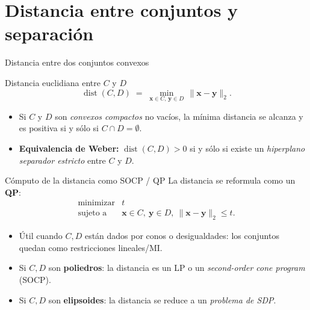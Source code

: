 \documentclass[10pt,aspectratio=169]{beamer}
\newcommand{\x}{\mathbf{x}}
\newcommand{\y}{\mathbf{y}}
\newcommand{\0}{\mathbf{0}}
\newcommand{\1}{\mathbf{1}}
\begin{document}
\section{Distancia entre conjuntos y separación}
\begin{frame}{Distancia entre dos conjuntos convexos}
  \begin{block}{Distancia euclidiana entre $C$ y $D$}
    \begin{equation*}
      \operatorname{dist}(C,D) \;=\; \min_{\x\in C,\,\y\in D}\, \|\x - \y\|_2.
    \end{equation*}
  \end{block}
  \begin{itemize}
    \item Si $C$ y $D$ son \emph{convexos compactos} no vacíos, la
          mínima distancia se alcanza y es positiva si y sólo si
          $C\cap D=\emptyset$.
    \item \textbf{Equivalencia de Weber:} $\operatorname{dist}(C,D)>0$
          si y sólo si existe un \emph{hiperplano separador estricto}
          entre $C$ y $D$.
  \end{itemize}
\end{frame}

\begin{frame}{Cómputo de la distancia como SOCP / QP}
  La distancia se reformula como un \textbf{QP}:
  \[
    \begin{array}{ll}
      \text{minimizar} & t \\
      \text{sujeto a}  & \x\in C,\ \y\in D,\ \|\x-\y\|_2 \le t.
    \end{array}
  \]
  \begin{itemize}
    \item Útil cuando $C,D$ están dados por conos o desigualdades:
          los conjuntos quedan como restricciones lineales/MI.
    \item Si $C,D$ son \textbf{poliedros}: la distancia es un LP o un
          \emph{second-order cone program} (SOCP).
    \item Si $C,D$ son \textbf{elipsoides}: la distancia se reduce a un
          \emph{problema de SDP}.
  \end{itemize}
\end{frame}
\end{document}
